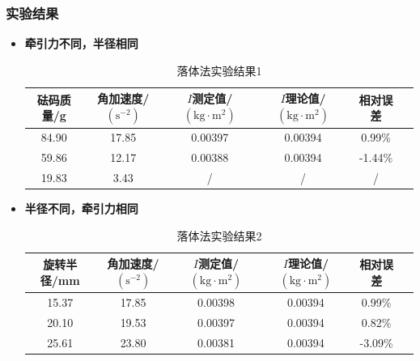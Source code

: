 \documentclass[12pt,hyperref,a4paper,UTF8]{ctexart}
\begin{document}
\subsubsection{实验结果}
    \begin{itemize}
        \item \textbf{牵引力不同，半径相同}
            \begin{table}[H]
                \centering
                \begin{tabular}{cccccc}
                \toprule
                \textbf{砝码质量/g} & \textbf{角加速度/$(\text{s}^{-2})$} & \textbf{$I$测定值/$(\text{kg}\cdot \text{m}^2)$} & \textbf{$I$理论值/$(\text{kg}\cdot \text{m}^2)$} & \textbf{相对误差} \\
                \midrule
                84.90 & 17.85 & 0.00397 & 0.00394 & 0.99\% \\
                59.86 & 12.17 & 0.00388 & 0.00394 & -1.44\% \\
                19.83 & 3.43 & /          & /          & / \\
                \bottomrule
                \end{tabular}
                \caption{落体法实验结果1}
                \end{table}
                
        \item \textbf{半径不同，牵引力相同}
            \begin{table}[H]
                \centering
                \begin{tabular}{cccccc}
                \toprule
                \textbf{旋转半径/mm} & \textbf{角加速度/$(\text{s}^{-2})$} & \textbf{$I$测定值/$(\text{kg}\cdot \text{m}^2)$} & \textbf{$I$理论值/$(\text{kg}\cdot \text{m}^2)$} & \textbf{相对误差} \\
                \midrule
                15.37 & 17.85 & 0.00398 & 0.00394 & 0.99\% \\
                20.10 & 19.53 & 0.00397 & 0.00394 & 0.82\% \\
                25.61 & 23.80 & 0.00381 & 0.00394 & -3.09\% \\
                \bottomrule
                \end{tabular}
                \caption{落体法实验结果2}
                \end{table}
                
    \end{itemize}
\end{document}
